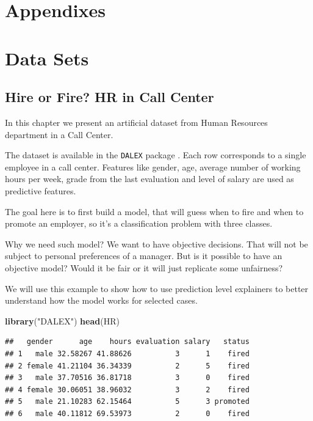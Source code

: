 \documentclass[]{krantz}
\newenvironment{Shaded}{\begin{snugshade}}{\end{snugshade}}
\newcommand{\KeywordTok}[1]{\textcolor[rgb]{0.13,0.29,0.53}{\textbf{#1}}}
\newcommand{\NormalTok}[1]{#1}
\newcommand{\StringTok}[1]{\textcolor[rgb]{0.31,0.60,0.02}{#1}}
\theoremstyle{definition}
\theoremstyle{definition}
\theoremstyle{definition}
\theoremstyle{remark}
\begin{document}
\hypertarget{appendixes}{%
\section*{Appendixes}\label{appendixes}}

\hypertarget{DataSets}{%
\section{Data Sets}\label{DataSets}}

\hypertarget{HRdataset}{%
\subsection{Hire or Fire? HR in Call Center}\label{HRdataset}}

In this chapter we present an artificial dataset from Human Resources
department in a Call Center.

The dataset is available in the \texttt{DALEX} package \citep{R-DALEX}.
Each row corresponds to a single employee in a call center. Features
like gender, age, average number of working hours per week, grade from
the last evaluation and level of salary are used as predictive features.

The goal here is to first build a model, that will guess when to fire
and when to promote an employer, so it's a classification problem with
three classes.

Why we need such model? We want to have objective decisions. That will
not be subject to personal preferences of a manager. But is it possible
to have an objective model? Would it be fair or it will just replicate
some unfairness?

We will use this example to show how to use prediction level explainers
to better understand how the model works for selected cases.

\begin{Shaded}
\begin{Highlighting}[]
\KeywordTok{library}\NormalTok{(}\StringTok{"DALEX"}\NormalTok{)}
\KeywordTok{head}\NormalTok{(HR)}
\end{Highlighting}
\end{Shaded}

\begin{verbatim}
##   gender      age    hours evaluation salary   status
## 1   male 32.58267 41.88626          3      1    fired
## 2 female 41.21104 36.34339          2      5    fired
## 3   male 37.70516 36.81718          3      0    fired
## 4 female 30.06051 38.96032          3      2    fired
## 5   male 21.10283 62.15464          5      3 promoted
## 6   male 40.11812 69.53973          2      0    fired
\end{verbatim}
\end{document}
